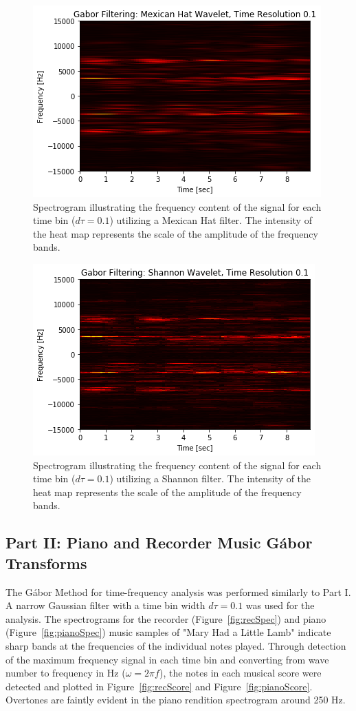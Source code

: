 \documentclass{article}
\begin{document}
\begin{figure}
    \centering
    \includegraphics[width=0.7\linewidth]{HW2_DanielBurnham_files/HW2_DanielBurnham_7_6.png}
    \caption{Spectrogram illustrating the frequency content of the signal for each time bin ($d\tau = 0.1$) utilizing a Mexican Hat filter. The intensity of the heat map represents the scale of the amplitude of the frequency bands.}
    \label{fig:mexSpec}
\end{figure}
\begin{figure}
    \centering
    \includegraphics[width=0.7\linewidth]{HW2_DanielBurnham_files/HW2_DanielBurnham_10_6.png}
    \caption{Spectrogram illustrating the frequency content of the signal for each time bin ($d\tau = 0.1$) utilizing a Shannon filter. The intensity of the heat map represents the scale of the amplitude of the frequency bands.}
    \label{fig:shanSpec}
\end{figure}

\subsection{Part II: Piano and Recorder Music G\'abor Transforms}
The G\'abor Method for time-frequency analysis was performed similarly to Part I. A narrow Gaussian filter with a time bin width $d\tau = 0.1$ was used for the analysis. The spectrograms for the recorder (Figure~\ref{fig:recSpec}) and piano (Figure~\ref{fig:pianoSpec}) music samples of "Mary Had a Little Lamb" indicate sharp bands at the frequencies of the individual notes played. Through detection of the maximum frequency signal in each time bin and converting from wave number to frequency in Hz ($\omega = 2\pi f$), the notes in each musical score were detected and plotted in Figure~\ref{fig:recScore} and Figure~\ref{fig:pianoScore}. Overtones are faintly evident in the piano rendition spectrogram around 250 Hz.
\end{document}
